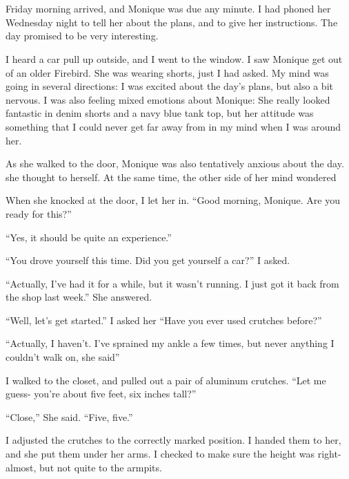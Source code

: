 \chapter{}
Friday morning arrived, and Monique was due any minute. I had phoned her Wednesday night to
tell her about the plans, and to give her instructions. The day promised to be very interesting.

I heard a car pull up outside, and I went to the window. I saw Monique get out of an older
Firebird. She was wearing shorts, just I had asked. My mind was going in several directions: I
was excited about the day's plans, but also a bit nervous. I was also feeling mixed emotions
about Monique: She really looked fantastic in denim shorts and a navy blue tank top, but her
attitude was something that I could never get far away from in my mind when I was around her.

As she walked to the door, Monique was also tentatively anxious about the day.  she thought to
herself. At the same time, the other side of her mind wondered 

When she knocked at the door, I let her in. ``Good morning, Monique. Are you ready for
this?''

``Yes, it should be quite an experience.''

``You drove yourself this time. Did you get yourself a car?'' I asked.

``Actually, I've had it for a while, but it wasn't running. I just got it back from the shop
last week.'' She answered.

``Well, let's get started.'' I asked her ``Have you ever used crutches before?''

``Actually, I haven't. I've sprained my ankle a few times, but never anything I couldn't
walk on, she said''

I walked to the closet, and pulled out a pair of aluminum crutches. ``Let me guess- you're
about five feet, six inches tall?''

``Close,'' She said. ``Five, five.''

I adjusted the crutches to the correctly marked position. I handed them to her, and she put
them under her arms. I checked to make sure the height was right- almost, but not quite to the
armpits.

